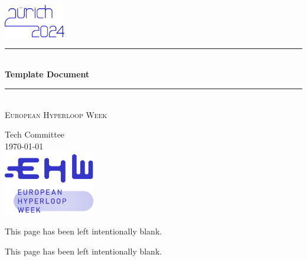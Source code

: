 \documentclass[a4paper, twoside,  12pt]{article}
\newcommand{\blankpage}{
  \thispagestyle{nobgpagestyle}
  \begin{center}
    \vspace*{\fill}
    This page has been left intentionally blank.
    \vspace*{\fill}
  \end{center}
  \newpage
}
\begin{document}
\NoBgThispage

\begin{titlepage}

\newcommand{\HRule}{\rule{\linewidth}{0.5mm}}
\center 
 
\includegraphics[width=0.2\textwidth]{images/ZurichImage.png}\\[1cm]

{\color{ehwBlue}\HRule} \\[0.8cm]
{\fontsize{36}{42}\selectfont \bfseries \textcolor{ehwBlue}{{Template Document }}}\\[0.7cm]		%
{\color{ehwBlue}\HRule} \\[2cm]
\textsc{\LARGE\textcolor{ehwBlue}{ European Hyperloop Week}}\\[1cm]
\large


\textcolor{ehwBlue}{Tech Committee}\\[1.5cm]
\huge \textcolor{ehwBlue}{\today}\\[4cm]
\includegraphics[width=0.3\textwidth]{images/LogoBlue.png}\\[1cm] 	%
\vfill 
{}
\end{titlepage}
\pagestyle{mypagestyle}




\blankpage


\newpage

\blankpage

\tableofcontents
\vfill
\end{document}
